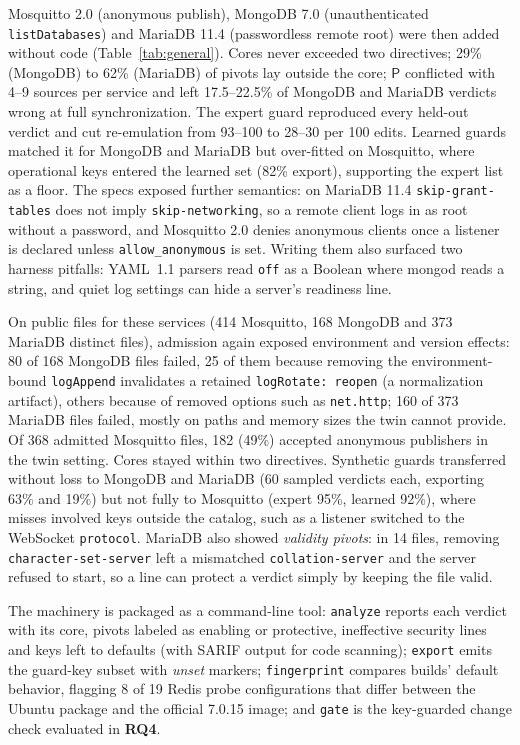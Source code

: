 \documentclass[conference]{IEEEtran}
\newcommand{\Pb}{\mathsf{P}}
\newcommand{\RQ}[1]{\textbf{RQ#1}}
\begin{document}
Mosquitto 2.0 (anonymous publish), MongoDB 7.0 (unauthenticated \texttt{listDatabases}) and MariaDB 11.4 (passwordless remote root) were then added without code (Table~\ref{tab:general}). Cores never exceeded two directives; 29\% (MongoDB) to 62\% (MariaDB) of pivots lay outside the core; $\Pb$ conflicted with 4--9 sources per service and left 17.5--22.5\% of MongoDB and MariaDB verdicts wrong at full synchronization. The expert guard reproduced every held-out verdict and cut re-emulation from 93--100 to 28--30 per 100 edits. Learned guards matched it for MongoDB and MariaDB but over-fitted on Mosquitto, where operational keys entered the learned set (82\% export), supporting the expert list as a floor. The specs exposed further semantics: on MariaDB 11.4 \texttt{skip-grant-tables} does not imply \texttt{skip-networking}, so a remote client logs in as root without a password, and Mosquitto 2.0 denies anonymous clients once a listener is declared unless \texttt{allow\_anonymous} is set. Writing them also surfaced two harness pitfalls: YAML~1.1 parsers read \texttt{off} as a Boolean where mongod reads a string, and quiet log settings can hide a server's readiness line.

On public files for these services (414 Mosquitto, 168 MongoDB and 373 MariaDB distinct files), admission again exposed environment and version effects: 80 of 168 MongoDB files failed, 25 of them because removing the environment-bound \texttt{logAppend} invalidates a retained \texttt{logRotate: reopen} (a normalization artifact), others because of removed options such as \texttt{net.http}; 160 of 373 MariaDB files failed, mostly on paths and memory sizes the twin cannot provide. Of 368 admitted Mosquitto files, 182 (49\%) accepted anonymous publishers in the twin setting. Cores stayed within two directives. Synthetic guards transferred without loss to MongoDB and MariaDB (60 sampled verdicts each, exporting 63\% and 19\%) but not fully to Mosquitto (expert 95\%, learned 92\%), where misses involved keys outside the catalog, such as a listener switched to the WebSocket \texttt{protocol}. MariaDB also showed \emph{validity pivots}: in 14 files, removing \texttt{character-set-server} left a mismatched \texttt{collation-server} and the server refused to start, so a line can protect a verdict simply by keeping the file valid.

The machinery is packaged as a command-line tool: \texttt{analyze} reports each verdict with its core, pivots labeled as enabling or protective, ineffective security lines and keys left to defaults (with SARIF output for code scanning); \texttt{export} emits the guard-key subset with \emph{unset} markers; \texttt{fingerprint} compares builds' default behavior, flagging 8 of 19 Redis probe configurations that differ between the Ubuntu package and the official 7.0.15 image; and \texttt{gate} is the key-guarded change check evaluated in \RQ{4}.
\end{document}
